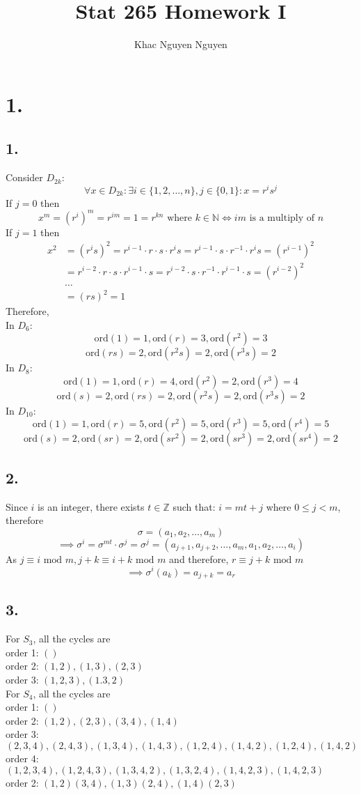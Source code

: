 \documentclass[11pt]{article}
\title{\textbf{Stat 265 Homework I}}
\author{Khac Nguyen Nguyen}
\date{}
\begin{document}
\section*{1.}
\subsection*{1.}
Consider $D_{2k}$: \[\forall x \in D_{2k}: \exists i \in \{1,2,\ldots,n\}, j \in \{0,1\}: x = r^is^j\]
If $j=0$ then 
\[
x^m = (r^i)^m = r^{im} = 1 = r^{kn} \text{ where } k \in \mathbb{N} \iff im \text{ is a multiply of } n  
\]
If $j=1$ then
\begin{equation*}
\begin{aligned}
x^2 &= (r^is)^2 = r^{i-1} \cdot r \cdot s \cdot r^is = r^{i-1} \cdot s \cdot r^{-1} \cdot r^is = (r^{i-1})^2\\
&= r^{i-2} \cdot r \cdot s \cdot r^{i-1} \cdot s = r^{i-2} \cdot s \cdot r^{-1} \cdot r^{i-1} \cdot s = (r^{i-2})^2\\
&\hdots \\
&= (rs)^2 = 1
\end{aligned}
\end{equation*}
Therefore, \\
In $D_6$:
\[
\text{ord}(1) = 1, \text{ord}(r) = 3, \text{ord}(r^2) = 3
\]
\[
\text{ord}(rs) = 2, \text{ord}(r^2s) = 2, \text{ord}(r^3s) = 2
\]
In $D_8$:
\[
\text{ord}(1) = 1, \text{ord}(r) = 4, \text{ord}(r^2) = 2,\text{ord}(r^3) = 4
\]
\[
\text{ord}(s) = 2, \text{ord}(rs) = 2, \text{ord}(r^2s) = 2, \text{ord}(r^3s) = 2
\]
In $D_{10}$:
\[
\text{ord}(1) = 1, \text{ord}(r) = 5, \text{ord}(r^2) = 5, \text{ord}(r^3) = 5, \text{ord}(r^4) = 5
\]
\[
\text{ord}(s) = 2, \text{ord}(sr) = 2, \text{ord}(sr^2) = 2, \text{ord}(sr^3) = 2, \text{ord}(sr^4) = 2
\]
\subsection*{2.}
Since $i$ is an integer, there exists $t \in \mathbb{Z}$ such that: $i = mt + j$ where $0\le j < m$, therefore
\[
\sigma = (a_1, a_2, \ldots, a_m) 
\]
\[\implies \sigma^i = \sigma^{mt} \cdot \sigma^{j} = \sigma^j =
(a_{j+1}, a_{j+2}, \ldots, a_m, a_1, a_2, \ldots, a_i)
\]
As $j \equiv i \text{ mod }  m, j+k \equiv i+k \text{ mod } m$ and therefore, $r \equiv j+k \text{ mod } m$
\[
\implies \sigma^i(a_k) = a_{j+k} = a_r
\]
\subsection*{3.}
For $S_3$, all the cycles are \\ 
order 1: $()$  \\ 
order 2: $(1,2), (1,3), (2,3)$ \\
order 3: $(1,2,3), (1.3,2)$ \\
For $S_4$, all the cycles are \\
order 1: $()$ \\
order 2: $(1,2),(2,3),(3,4),(1,4)$ \\
order 3: $(2,3,4), (2,4,3), (1,3,4), (1,4,3), (1,2,4), (1,4,2), (1,2,4), (1,4,2)$ \\
order 4: $(1,2,3,4), (1,2,4,3), (1,3,4,2), (1,3,2,4), (1,4,2,3), (1,4,2,3)$ \\
order 2: $(1,2)(3,4), (1,3)(2,4), (1,4)(2,3) $
\pagebreak
\end{document}
